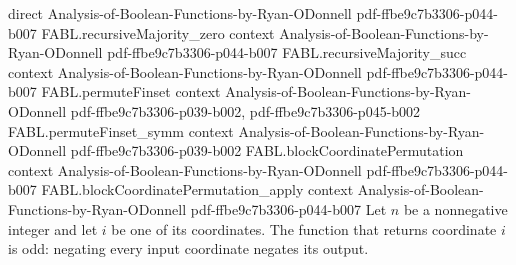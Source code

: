 \begin{theorem}
  {direct}
  {Analysis-of-Boolean-Functions-by-Ryan-ODonnell}
  {pdf-ffbe9c7b3306-p044-b007}
\proofstep
  {FABL.recursiveMajority_zero}
  {context}
  {Analysis-of-Boolean-Functions-by-Ryan-ODonnell}
  {pdf-ffbe9c7b3306-p044-b007}
\proofstep
  {FABL.recursiveMajority_succ}
  {context}
  {Analysis-of-Boolean-Functions-by-Ryan-ODonnell}
  {pdf-ffbe9c7b3306-p044-b007}
\proofstep
  {FABL.permuteFinset}
  {context}
  {Analysis-of-Boolean-Functions-by-Ryan-ODonnell}
  {pdf-ffbe9c7b3306-p039-b002,
    pdf-ffbe9c7b3306-p045-b002}
\proofstep
  {FABL.permuteFinset_symm}
  {context}
  {Analysis-of-Boolean-Functions-by-Ryan-ODonnell}
  {pdf-ffbe9c7b3306-p039-b002}
\proofstep
  {FABL.blockCoordinatePermutation}
  {context}
  {Analysis-of-Boolean-Functions-by-Ryan-ODonnell}
  {pdf-ffbe9c7b3306-p044-b007}
\proofstep
  {FABL.blockCoordinatePermutation_apply}
  {context}
  {Analysis-of-Boolean-Functions-by-Ryan-ODonnell}
  {pdf-ffbe9c7b3306-p044-b007}
Let $n$ be a nonnegative integer and let $i$ be one of its coordinates. The function
that returns coordinate $i$ is odd: negating every input coordinate negates its output.
\end{theorem}

